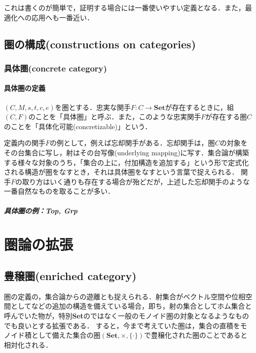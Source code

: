 \documentclass[uplatex, 12pt, dvipdfmx]{jsreport}
\begin{document}
\begin{definition}[普遍射を用いた定義]
    
\end{definition}
これは書くのが簡単で，証明する場合には一番使いやすい定義となる．また，最適化への応用へも一番近い．

\begin{definition}
    
\end{definition}

\chapter{圏の構成(constructions on categories)}

\section{具体圏(concrete category)}

\subsection{具体圏の定義}
\begin{shadebox}\begin{definition}[具体圏]\rm{}
    $(C,M,s,t,c,e)$を圏とする．忠実な関手$F:C\rightarrow \mathbf{Set}$が存在するときに，組$(C,F)$のことを「具体圏」と呼ぶ．また，このような忠実関手$F$が存在する圏$C$のことを「具体化可能(concretizable)」という．
\end{definition}\end{shadebox}
定義内の関手$F$の例として，例えば忘却関手がある．忘却関手は，圏$C$の対象をその台集合に写し，射はその台写像(underlying mapping)に写す．集合論が構築する様々な対象のうち，「集合の上に，付加構造を追加する」という形で定式化される構造が圏をなすとき，それは具体圏をなすという言葉で捉えられる．
関手$F$の取り方はいく通りも存在する場合が殆どだが，上述した忘却関手のような一番自然なものを取ることが多い．

\subsubsection{具体圏の例：\textbf{Top, Grp}}

\part{圏論の拡張}

\chapter{豊穣圏(enriched category)}
圏の定義の，集合論からの遊離とも捉えられる．射集合がベクトル空間や位相空間としてなどの追加の構造を備えている場合，即ち，射の集合としてホム集合と呼んでいた物が，特別\textbf{Set}のではなく一般のモノイド圏の対象となるようなものでも良いとする拡張である．
すると，今まで考えていた圏は，集合の直積をモノイド積として備えた集合の圏$(\mathbf{Set},\times,\{\cdot\} )$で豊穣化された圏のことであると相対化される．
\end{document}
